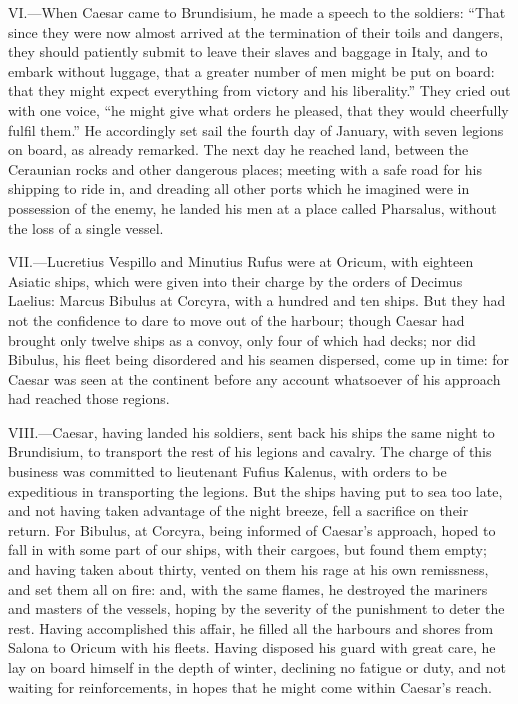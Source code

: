 VI.—When Caesar came to Brundisium, he made a speech to the soldiers:
``That since they were now almost arrived at the termination of their
toils and dangers, they should patiently submit to leave their slaves
and baggage in Italy, and to embark without luggage, that a greater
number of men might be put on board: that they might expect everything
from victory and his liberality.'' They cried out with one voice, ``he
might give what orders he pleased, that they would cheerfully fulfil
them.'' He accordingly set sail the fourth day of January, with seven
legions on board, as already remarked. The next day he reached land,
between the Ceraunian rocks and other dangerous places; meeting with a
safe road for his shipping to ride in, and dreading all other ports
which he imagined were in possession of the enemy, he landed his men at
a place called Pharsalus, without the loss of a single vessel.

VII.—Lucretius Vespillo and Minutius Rufus were at Oricum, with
eighteen Asiatic ships, which were given into their charge by the orders
of Decimus Laelius: Marcus Bibulus at Corcyra, with a hundred and ten
ships. But they had not the confidence to dare to move out of the
harbour; though Caesar had brought only twelve ships as a convoy, only
four of which had decks; nor did Bibulus, his fleet being disordered and
his seamen dispersed, come up in time: for Caesar was seen at the
continent before any account whatsoever of his approach had reached
those regions.

VIII.—Caesar, having landed his soldiers, sent back his ships the same
night to Brundisium, to transport the rest of his legions and cavalry.
The charge of this business was committed to lieutenant Fufius Kalenus,
with orders to be expeditious in transporting the legions. But the ships
having put to sea too late, and not having taken advantage of the night
breeze, fell a sacrifice on their return. For Bibulus, at Corcyra, being
informed of Caesar's approach, hoped to fall in with some part of our
ships, with their cargoes, but found them empty; and having taken about
thirty, vented on them his rage at his own remissness, and set them all
on fire: and, with the same flames, he destroyed the mariners and
masters of the vessels, hoping by the severity of the punishment to
deter the rest. Having accomplished this affair, he filled all the
harbours and shores from Salona to Oricum with his fleets. Having
disposed his guard with great care, he lay on board himself in the depth
of winter, declining no fatigue or duty, and not waiting for
reinforcements, in hopes that he might come within Caesar's reach.

